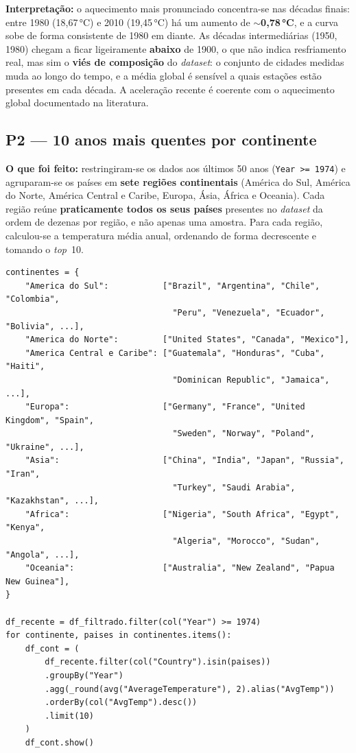 \textbf{Interpretação:} o aquecimento mais pronunciado concentra-se nas décadas finais:
entre 1980 (18,67\,°C) e 2010 (19,45\,°C) há um aumento de $\sim$\textbf{0,78\,°C}, e a
curva sobe de forma consistente de 1980 em diante. As décadas intermediárias (1950, 1980)
chegam a ficar ligeiramente \textbf{abaixo} de 1900, o que não indica resfriamento real,
mas sim o \textbf{viés de composição} do \textit{dataset}: o conjunto de cidades medidas
muda ao longo do tempo, e a média global é sensível a quais estações estão presentes em
cada década. A aceleração recente é coerente com o aquecimento global documentado na
literatura.

\subsection{P2 --- 10 anos mais quentes por continente}

\textbf{O que foi feito:} restringiram-se os dados aos últimos 50 anos
(\texttt{Year >= 1974}) e agruparam-se os países em \textbf{sete regiões continentais}
(América do Sul, América do Norte, América Central e Caribe, Europa, Ásia, África e
Oceania). Cada região reúne \textbf{praticamente todos os seus países} presentes no
\textit{dataset} da ordem de dezenas por região, e não apenas uma amostra. Para
cada região, calculou-se a temperatura média anual, ordenando de forma decrescente e
tomando o \textit{top}~10.

\begin{lstlisting}[caption={Ranking dos anos mais quentes por região continental.},label={lst:p2}]
continentes = {
    "America do Sul":           ["Brazil", "Argentina", "Chile", "Colombia",
                                  "Peru", "Venezuela", "Ecuador", "Bolivia", ...],
    "America do Norte":         ["United States", "Canada", "Mexico"],
    "America Central e Caribe": ["Guatemala", "Honduras", "Cuba", "Haiti",
                                  "Dominican Republic", "Jamaica", ...],
    "Europa":                   ["Germany", "France", "United Kingdom", "Spain",
                                  "Sweden", "Norway", "Poland", "Ukraine", ...],
    "Asia":                     ["China", "India", "Japan", "Russia", "Iran",
                                  "Turkey", "Saudi Arabia", "Kazakhstan", ...],
    "Africa":                   ["Nigeria", "South Africa", "Egypt", "Kenya",
                                  "Algeria", "Morocco", "Sudan", "Angola", ...],
    "Oceania":                  ["Australia", "New Zealand", "Papua New Guinea"],
}

df_recente = df_filtrado.filter(col("Year") >= 1974)
for continente, paises in continentes.items():
    df_cont = (
        df_recente.filter(col("Country").isin(paises))
        .groupBy("Year")
        .agg(_round(avg("AverageTemperature"), 2).alias("AvgTemp"))
        .orderBy(col("AvgTemp").desc())
        .limit(10)
    )
    df_cont.show()
\end{lstlisting}

